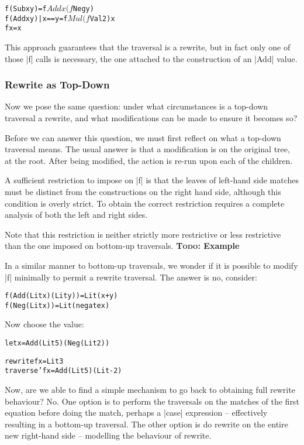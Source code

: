 \documentclass[preprint]{sigplanconf}
\newcommand{\todo}[1]{\textbf{\textsc{Todo:} #1}}
\newenvironment{code}{\begin{alltt}\small}{\end{alltt}}
\begin{document}
\begin{code}
f (Sub x y)           = f $ Add x (f $ Neg y)
f (Add x y) | x == y  = f $ Mul (f $ Val 2) x
f x                   = x
\end{code}

This approach guarantees that the traversal is a rewrite, but in fact only one of those |f| calls is necessary, the one attached to the construction of an |Add| value.


\subsubsection{Rewrite as Top-Down}

Now we pose the same question: under what circumstances is a top-down traversal a rewrite, and what modifications can be made to ensure it becomes so?

Before we can answer this question, we must first reflect on what a top-down traversal means. The usual answer is that a modification is on the original tree, at the root. After being modified, the action is re-run upon each of the children.

A sufficient restriction to impose on |f| is that the leaves of left-hand side matches must be distinct from the constructions on the right hand side, although this condition is overly strict. To obtain the correct restriction requires a complete analysis of both the left and right sides.

Note that this restriction is neither strictly more restrictive or less restrictive than the one imposed on bottom-up traversals. \todo{Example}

In a similar manner to bottom-up traversals, we wonder if it is possible to modify |f| minimally to permit a rewrite traversal. The answer is no, consider:

\begin{code}
f (Add (Lit x) (Lit y)  ) = Lit (x+y)
f (Neg (Lit x)          ) = Lit (negate x)
\end{code}

Now choose the value:

\begin{code}
let x = Add (Lit 5) (Neg (Lit 2))

rewrite f x = Lit 3
traverse' f x = Add (Lit 5) (Lit -2)
\end{code}

Now, are we able to find a simple mechanism to go back to obtaining full rewrite behaviour? No. One option is to perform the traversals on the matches of the first equation before doing the match, perhaps a |case| expression -- effectively resulting in a bottom-up traversal. The other option is do rewrite on the entire new right-hand side -- modelling the behaviour of rewrite.
\end{document}
